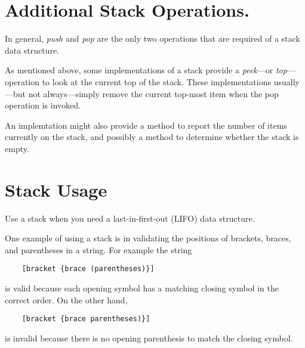 \documentclass{article}
\begin{document}
  \section{Additional Stack Operations.}
  In general, \emph{push} and \emph{pop} are the only two operations that are required of a stack data structure.

  As mentioned above, some implementations of a stack provide a \emph{peek}---or \emph{top}---operation to look at the current top of the stack. These implementations usually---but not always---simply remove the current top-most item when the pop operation is invoked.

  An implemtation might also provide a method to report the number of items currently on the stack, and possibly a method to determine whether the stack is empty.

  \section{Stack Usage}
  Use a stack when you need a last-in-first-out (LIFO) data structure.

  One example of using a stack is in validating the positions of brackets, braces, and parentheses in a string. For example the string
  \begin{verbatim}
    [bracket {brace (parentheses)}]\end{verbatim}
  is valid because each opening symbol has a matching closing symbol in the correct order. On the other hand,
  \begin{verbatim}
    [bracket {brace parentheses)}]\end{verbatim}
  is invalid because there is no opening parenthesis to match the closing symbol.
\end{document}
